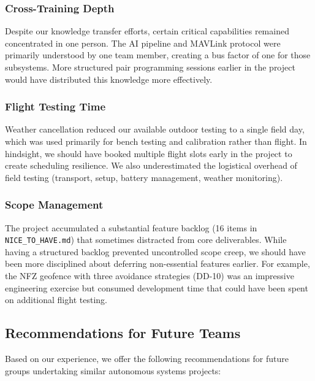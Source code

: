 \subsubsection{Cross-Training Depth}

Despite our knowledge transfer efforts, certain critical capabilities remained concentrated in one person. The AI pipeline and MAVLink protocol were primarily understood by one team member, creating a bus factor of one for those subsystems. More structured pair programming sessions earlier in the project would have distributed this knowledge more effectively.

\subsubsection{Flight Testing Time}

Weather cancellation reduced our available outdoor testing to a single field day, which was used primarily for bench testing and calibration rather than flight. In hindsight, we should have booked multiple flight slots early in the project to create scheduling resilience. We also underestimated the logistical overhead of field testing (transport, setup, battery management, weather monitoring).

\subsubsection{Scope Management}

The project accumulated a substantial feature backlog (16 items in \texttt{NICE\_TO\_HAVE.md}) that sometimes distracted from core deliverables. While having a structured backlog prevented uncontrolled scope creep, we should have been more disciplined about deferring non-essential features earlier. For example, the NFZ geofence with three avoidance strategies (DD-10) was an impressive engineering exercise but consumed development time that could have been spent on additional flight testing.

\subsection{Recommendations for Future Teams}

Based on our experience, we offer the following recommendations for future groups undertaking similar autonomous systems projects:

